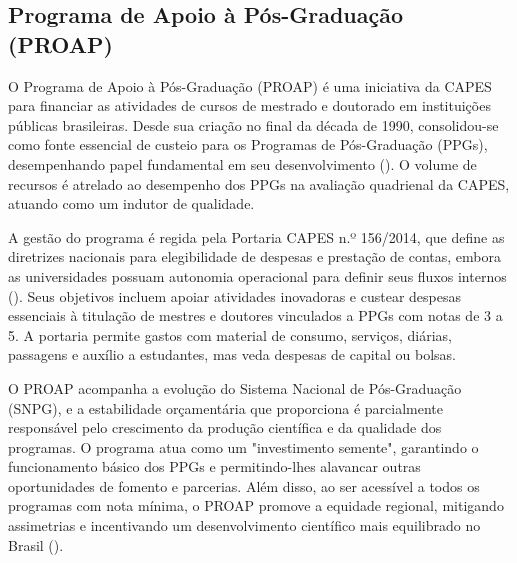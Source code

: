 \documentclass[portuguese]{sbc2025}%
\begin{document}
\subsection{Programa de Apoio à Pós-Graduação (PROAP)}

O Programa de Apoio à Pós-Graduação (PROAP) é uma iniciativa da CAPES para financiar as atividades de cursos de mestrado e doutorado em instituições públicas brasileiras. Desde sua criação no final da década de 1990, consolidou-se como fonte essencial de custeio para os Programas de Pós-Graduação (PPGs), desempenhando papel fundamental em seu desenvolvimento (\cite{CAPES_History}). O volume de recursos é atrelado ao desempenho dos PPGs na avaliação quadrienal da CAPES, atuando como um indutor de qualidade.

A gestão do programa é regida pela Portaria CAPES n.º 156/2014, que define as diretrizes nacionais para elegibilidade de despesas e prestação de contas, embora as universidades possuam autonomia operacional para definir seus fluxos internos (\cite{CAPES2014}). Seus objetivos incluem apoiar atividades inovadoras e custear despesas essenciais à titulação de mestres e doutores vinculados a PPGs com notas de 3 a 5. A portaria permite gastos com material de consumo, serviços, diárias, passagens e auxílio a estudantes, mas veda despesas de capital ou bolsas.

O PROAP acompanha a evolução do Sistema Nacional de Pós-Graduação (SNPG), e a estabilidade orçamentária que proporciona é parcialmente responsável pelo crescimento da produção científica e da qualidade dos programas. O programa atua como um "investimento semente", garantindo o funcionamento básico dos PPGs e permitindo-lhes alavancar outras oportunidades de fomento e parcerias. Além disso, ao ser acessível a todos os programas com nota mínima, o PROAP promove a equidade regional, mitigando assimetrias e incentivando um desenvolvimento científico mais equilibrado no Brasil (\cite{Andrade2023}).


\end{document}
